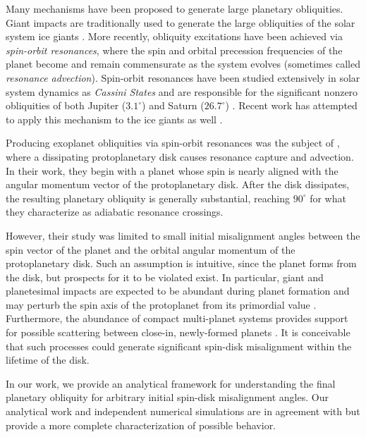 \documentclass[
        fleqn,
        usenatbib,
        referee,
    ]{mnras}
\begin{document}
Many mechanisms have been proposed to generate large planetary obliquities.
Giant impacts are traditionally used to generate the large obliquities of the
solar system ice giants \citep{original_gi, morbidelli_gi}. More recently,
obliquity excitations have been achieved via \emph{spin-orbit resonances}, where
the spin and orbital precession frequencies of the planet become and remain
commensurate as the system evolves (sometimes called \emph{resonance
advection}). Spin-orbit resonances have been studied extensively in solar system
dynamics as \emph{Cassini States} and are responsible for the significant
nonzero obliquities of both Jupiter ($3.1^\circ$) and Saturn ($26.7^\circ$)
\citep{colombo1966, henrard1987, ward2004I, ward_jupiter}. Recent work has
attempted to apply this mechanism to the ice giants as well
\citep{hamilton_tilting_ice}.

Producing exoplanet obliquities via spin-orbit resonances was the subject of
\citet{millholland_disk}, where a dissipating protoplanetary disk causes
resonance capture and advection. In their work, they begin with a planet whose
spin is nearly aligned with the angular momentum vector of the protoplanetary
disk. After the disk dissipates, the resulting planetary obliquity is generally
substantial, reaching $90^\circ$ for what they characterize as adiabatic
resonance crossings.

However, their study was limited to small initial misalignment angles between
the spin vector of the planet and the orbital angular momentum of the
protoplanetary disk. Such an assumption is intuitive, since the planet forms
from the disk, but prospects for it to be violated exist. In particular, giant
and planetesimal impacts are expected to be abundant during planet formation and
may perturb the spin axis of the protoplanet from its primordial value
\citep{yalinewich2019atmospheric, schlichting2015atmospheric}. Furthermore, the
abundance of compact multi-planet systems provides support for possible
scattering between close-in, newly-formed planets \citep{usp_compact1,
usp_review}. It is conceivable that such processes could generate significant
spin-disk misalignment within the lifetime of the disk.

In our work, we provide an analytical framework for understanding the final
planetary obliquity for arbitrary initial spin-disk misalignment angles. Our
analytical work and independent numerical simulations are in agreement with
\citet{millholland_disk} but provide a more complete characterization of
possible behavior.
\end{document}
